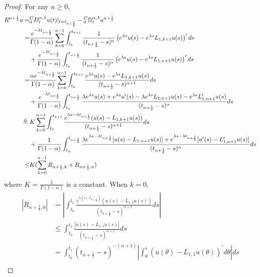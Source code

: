 \documentclass[10pt, reqno]{amsart}
\theoremstyle{remark}
\theoremstyle{definition}
\numberwithin{table}{section}
\begin{document}
\begin{proof}
For any $n \geq 0$, 
    \begin{align}\label{R1}
        R^{n+\frac{1}{2}}u=&{}^C_0D^{\alpha, \lambda}_tu(t)|_{t=t_{n+\frac{1}{2}}}- {}^C_0\mathbb{D}_t^{\alpha,  \lambda} u^{n+\frac{1}{2}}\notag\\
        =&\frac{e^{-\lambda t_{n+\frac{1}{2}}}}{\Gamma(1-\alpha)}\sum_{k=0}^{n-1}\int_{t_k}^{t_{k+1}}\frac1{(t_{n+\frac{1}{2}}-s)^\alpha}\left(e^{\lambda s}u(s) -e^{\lambda s}L_{1, k+1}u(s)\right)^{\prime}ds\notag\\
        &+\frac{e^{-\lambda t_{n+\frac{1}{2}}}}{\Gamma(1-\alpha)}\int_{t_n}^{t_{n+\frac{1}{2}}}\frac1{(t_{n+\frac{1}{2}}-s)^\alpha}\left(e^{\lambda s}u(s)-e^{\lambda s}L_{1, n+1}u(s)\right)^{\prime}ds\notag\\
        =&\frac{\alpha e^{-\lambda t_{n+\frac{1}{2}}}}{\Gamma(1-\alpha)}\sum_{k=0}^{n-1}\int_{t_k}^{t_{k+1}}\frac{e^{\lambda s}u(s)-e^{\lambda s}L_{1, k+1}u(s)}{(t_{n+\frac{1}{2}}-s)^{\alpha+1}}ds\notag \\
        &+\frac{e^{-\lambda t_{n+\frac{1}{2}}}}{\Gamma(1-\alpha)}\int_{t_n}^{t_{n+\frac{1}{2}}}\frac{\lambda e^{\lambda s}u(s)+e^{\lambda s}u'(s)-\lambda e^{\lambda s}L_{1, n+1}u(s)-e^{\lambda s}L_{1, n+1}'u(s)}{(t_{n+\frac{1}{2}}-s)^\alpha}ds\notag\\
        \triangleq{}&K\sum_{k=0}^{n-1}\int_{t_k}^{t_{k+1}}\frac{e^{\lambda s-\lambda t_{n+\frac{1}{2}}}(u(s)-L_{1, k+1}u(s))}{(t_{n+\frac{1}{2}}-s)^{\alpha+1}}ds\notag\\
        &+\frac{1}{\Gamma(1-\alpha)}\int_{t_n}^{t_{n+\frac{1}{2}}}\frac{\lambda e^{\lambda s-\lambda t_{n+\frac{1}{2}}}[u(s)-L_{1, n+1}u(s)]+e^{\lambda s-\lambda t_{n+\frac{1}{2}}}[u'(s)-L_{1, n+1}'u(s)]}{(t_{n+\frac{1}{2}}-s)^\alpha}ds\notag\\
        \leq&K(\sum_{k=0}^{n-1}R_{{n+\frac{1}{2}}, k}+R_{{n+\frac{1}{2}}, n})
    \end{align}
where $K = \frac{1}{\Gamma(1-\alpha)}$ is a constant. 
When $k=0$, 
\begin{equation}
    \begin{aligned}
|R_{{n+\frac{1}{2}}, 0}| &= |\int_{t_0}^{t_{1}}\frac{e^{\lambda( s- t_{n+\frac{1}{2}})}(u(s)-L_{1, 1}u(s))}{(t_{n+\frac{1}{2}}-s)^{\alpha+1}}ds|\\
&\leq \int_{t_0}^{t_{1}}\frac{|u(s)-L_{1, 1}u(s)|}{(t_{n+\frac{1}{2}}-s)^{\alpha+1}}ds\\
& =\int_{t_0}^{t_1}\left(t_{n+\frac{1}{2}}-s\right)^{-(\alpha+1)}\left|\int_0^s\left(u(\theta)-L_{1, 1} u(\theta)\right)^{\prime} d \theta\right| d s \\

\end{aligned}
\end{equation}
\end{proof}
\end{document}
